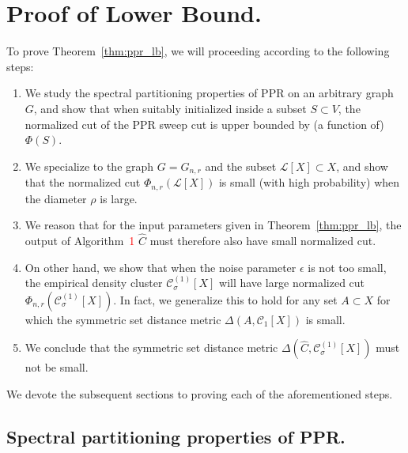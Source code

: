\documentclass[11pt,twoside]{article}
\newcommand{\1}{\mathbf{1}}
\newcommand{\Xbf}{X}             %
\newcommand{\Cset}{\mathcal{C}}
\newcommand{\Csig}{\Cset_{\sigma}}
\begin{document}
\clearpage


\section{Proof of Lower Bound.}

To prove Theorem~\ref{thm:ppr_lb}, we will proceeding according to the following steps:
\begin{enumerate}
	\item We study the spectral partitioning properties of PPR on an arbitrary graph $G$, and show that when suitably initialized inside a subset $S \subset V$, the normalized cut of the PPR sweep cut is upper bounded by (a function of) $\Phi(S)$. 
	\item We specialize to the graph $G = G_{n,r}$ and the subset $\mathcal{L}[\Xbf] \subset \Xbf$, and show that the normalized cut $\Phi_{n,r}(\mathcal{L}[\Xbf])$ is small (with high probability) when the diameter $\rho$ is large.
	\item We reason that for the input parameters given in Theorem~\ref{thm:ppr_lb}, the output of Algorithm~\textcolor{red}{1} $\widehat{C}$ must therefore also have small normalized cut.
	\item On other hand, we show that when the noise parameter $\epsilon$ is not too small, the empirical density cluster $\Csig^{(1)}[\Xbf]$ will have large normalized cut $\Phi_{n,r}(\Csig^{(1)}[\Xbf])$. In fact, we generalize this to hold for any set $A \subset \Xbf$ for which the symmetric set distance metric $\Delta(A,\Cset_1[\Xbf])$ is small.
	\item We conclude that the symmetric set distance metric $\Delta(\widehat{C},\Csig^{(1)}[\Xbf])$ must not be small.
\end{enumerate}

We devote the subsequent sections to proving each of the aforementioned steps.

\subsection{Spectral partitioning properties of PPR.}
\end{document}
